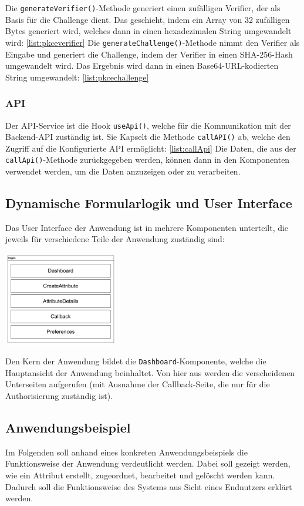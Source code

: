 Die \texttt{generateVerifier()}-Methode generiert einen zufälligen Verifier, der als Basis für die Challenge dient. Das geschieht, indem 
ein Array von 32 zufälligen Bytes generiert wird, welches dann in einen hexadezimalen String umgewandelt wird: \ref{list:pkceverifier}
Die \texttt{generateChallenge()}-Methode nimmt den Verifier als Eingabe und generiert die Challenge, indem der Verifier in einen SHA-256-Hash umgewandelt wird.
Das Ergebnis wird dann in einen Base64-URL-kodierten String umgewandelt: \ref{list:pkcechallenge}
\subsubsection{API}
Der API-Service ist die Hook \texttt{useApi()}, welche für die Kommunikation mit der Backend-API zuständig ist. 
Sie Kapselt die Methode \texttt{callAPI()} ab, welche den Zugriff auf die Konfigurierte API ermöglicht: \ref{list:callApi}
Die Daten, die aus der \texttt{callApi()}-Methode zurückgegeben werden, können dann in den Komponenten verwendet werden, um die Daten anzuzeigen oder zu verarbeiten.
\subsection{Dynamische Formularlogik und User Interface}
Das User Interface der Anwendung ist in mehrere Komponenten unterteilt, die jeweils für verschiedene Teile der Anwendung zuständig sind:\break
\begin{center}
    \includegraphics[width=5cm]{./img/dashboardFileStructure.png}
\end{center}
Den Kern der Anwendung bildet die \texttt{Dashboard}-Komponente, welche die Hauptansicht der Anwendung beinhaltet. Von hier aus werden die verscheidenen
Unterseiten aufgerufen (mit Ausnahme der Callback-Seite, die nur für die Authorisierung zuständig ist).
\subsection{Anwendungsbeispiel}
Im Folgenden soll anhand eines konkreten Anwendungsbeispiels die Funktionsweise der Anwendung verdeutlicht werden. Dabei soll gezeigt werden, wie ein Attribut erstellt,
zugeordnet, bearbeitet und gelöscht werden kann. Dadurch soll die Funktionsweise des Systems aus Sicht eines Endnutzers erklärt werden.

